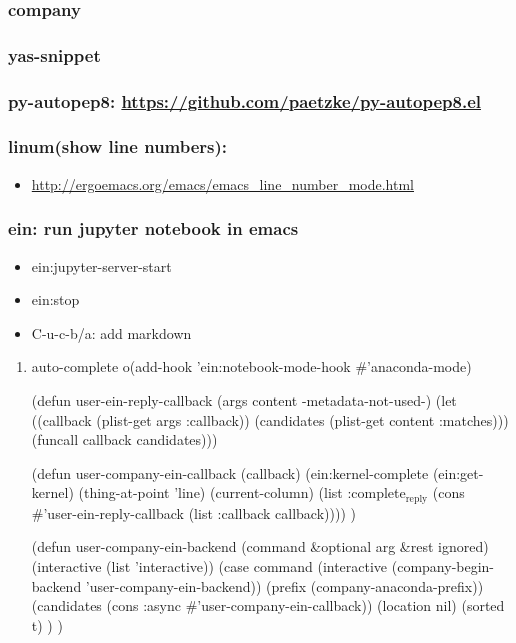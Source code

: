 \documentclass[11pt]{article}
\begin{document}
\subsubsection{company}
\label{sec:org7fa2e00}
\subsubsection{yas-snippet}
\label{sec:orgbeef690}
\subsubsection{py-autopep8: \url{https://github.com/paetzke/py-autopep8.el}}
\label{sec:org58e0562}
\subsubsection{linum(show line numbers):}
\label{sec:org751305c}
\begin{itemize}
\item \url{http://ergoemacs.org/emacs/emacs\_line\_number\_mode.html}
\end{itemize}
\subsubsection{ein: run jupyter notebook in emacs}
\label{sec:org942c92c}
\begin{itemize}
\item ein:jupyter-server-start
\item ein:stop
\item C-u-c-b/a: add markdown
\end{itemize}
\begin{enumerate}
\item auto-complete
\label{sec:orgfc1fe34}
o(add-hook 'ein:notebook-mode-hook \#'anaconda-mode)

(defun user-ein-reply-callback (args content -metadata-not-used-)
  (let ((callback (plist-get args :callback))
        (candidates (plist-get content :matches)))
    (funcall callback candidates)))

(defun user-company-ein-callback (callback)
  (ein:kernel-complete
   (ein:get-kernel)
   (thing-at-point 'line)
   (current-column)
   (list :complete\(_{\text{reply}}\)
         (cons \#'user-ein-reply-callback (list :callback callback))))
  )

(defun user-company-ein-backend (command \&optional arg \&rest ignored)
  (interactive (list 'interactive))
  (case command
    (interactive (company-begin-backend 'user-company-ein-backend))
    (prefix (company-anaconda-prefix))
    (candidates (cons :async \#'user-company-ein-callback))
    (location nil)
    (sorted t)
    )
  )
\end{enumerate}
\end{document}
